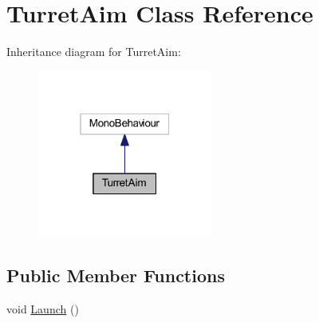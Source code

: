 \hypertarget{class_turret_aim}{}\section{Turret\+Aim Class Reference}
\label{class_turret_aim}


Inheritance diagram for Turret\+Aim\+:
\nopagebreak
\begin{figure}[H]
\begin{center}
\leavevmode
\includegraphics[width=163pt]{class_turret_aim__inherit__graph}
\end{center}
\end{figure}
\subsection*{Public Member Functions}
\begin{DoxyCompactItemize}
\item 
void \hyperlink{class_turret_aim_a0676e7bfdf3631856418337b19e9224d}{Launch} ()
\end{DoxyCompactItemize}
